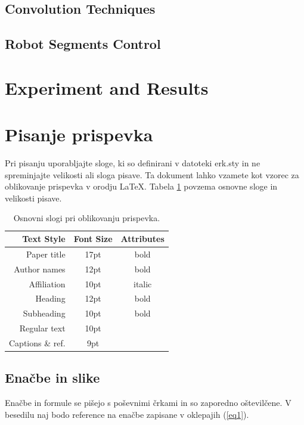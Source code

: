 \documentclass[a4paper]{article}
\begin{document}
\subsection{Convolution Techniques}

\subsection{Robot Segments Control}

\section{Experiment and Results}

\section{Pisanje prispevka}

Pri pisanju uporabljajte sloge, ki so definirani v datoteki erk.sty in ne spreminjajte velikosti ali sloga pisave. Ta dokument lahko vzamete kot vzorec za oblikovanje prispevka v orodju \LaTeX.
Tabela \ref{tab1} povzema osnovne sloge in velikosti pisave.

\begin{table}[h]
\caption{Osnovni slogi pri oblikovanju prispevka.} \label{tab1}
\smallskip
\begin{center}
\begin{tabular}{ | r | c | c | }
\hline  
  \textbf{Text Style} & \textbf{Font Size} & \textbf{Attributes}\\ 
\hline  
  Paper title & 17pt & bold\\
  Author names & 12pt & bold\\
  Affiliation & 10pt & italic\\
  Heading & 12pt & bold \\
  Subheading & 10pt & bold\\
  Regular text & 10pt &\\
  Captions \& ref. & 9pt &\\
\hline  
\end{tabular}
\end{center}
\end{table}

\subsection{Enačbe in slike}

Enačbe in formule se pišejo s poševnimi črkami in so zaporedno oštevilčene. V besedilu naj bodo reference na enačbe zapisane v oklepajih (\ref{eq1}).
\end{document}
